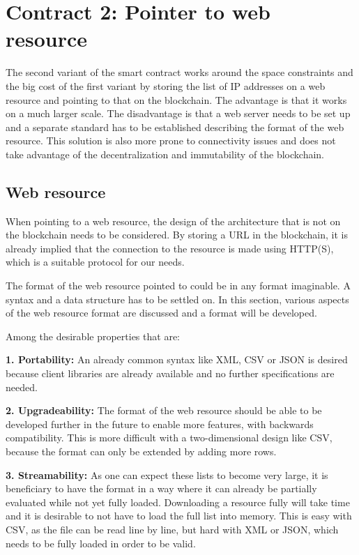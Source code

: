 

\section{Contract 2: Pointer to web resource}
The second variant of the smart contract works around the space constraints and the big cost of the first variant by storing the list of IP addresses on a web resource and pointing to that on the blockchain. The advantage is that it works on a much larger scale. The disadvantage is that a web server needs to be set up and a separate standard has to be established describing the format of the web resource. This solution is also more prone to connectivity issues and does not take advantage of the decentralization and immutability of the blockchain. 

\subsection{Web resource}
When pointing to a web resource, the design of the architecture that is not on the blockchain needs to be considered. By storing a URL in the blockchain, it is already implied that the connection to the resource is made using HTTP(S), which is a suitable protocol for our needs.

The format of the web resource pointed to could be in any format imaginable. A syntax and a data structure has to be settled on. In this section, various aspects of the web resource format are discussed and a format will be developed.

Among the desirable properties that are:

\textbf{1. Portability:} An already common syntax like XML, CSV or JSON is desired because client libraries are already available and no further specifications are needed.

\textbf{2. Upgradeability:} The format of the web resource should be able to be developed further in the future to enable more features, with backwards compatibility. This is more difficult with a two-dimensional design like CSV, because the format can only be extended by adding more rows.

\textbf{3. Streamability:} As one can expect these lists to become very large, it is beneficiary to have the format in a way where it can already be partially evaluated while not yet fully loaded. Downloading a resource fully will take time and it is desirable to not have to load the full list into memory. This is easy with CSV, as the file can be read line by line, but hard with XML or JSON, which needs to be fully loaded in order to be valid.


